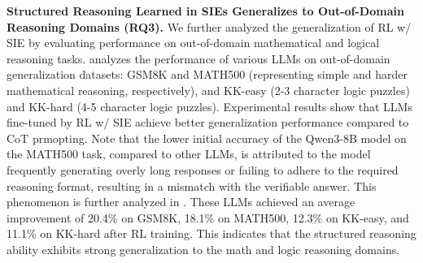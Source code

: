 \documentclass{article} %
\begin{document}
\textbf{Structured Reasoning Learned in SIEs Generalizes to Out-of-Domain Reasoning Domains (RQ3).} 
We further analyzed the generalization of RL w/ SIE by evaluating performance on out-of-domain mathematical and logical reasoning tasks. 
 analyzes the performance of various LLMs on out-of-domain generalization datasets: GSM8K and MATH500 (representing simple and harder mathematical reasoning, respectively), and KK-easy (2-3 character logic puzzles) and KK-hard (4-5 character logic puzzles). Experimental results show that LLMs fine-tuned by RL w/ SIE achieve better generalization performance compared to CoT prmopting. 
Note that the lower initial accuracy of the Qwen3-8B model on the MATH500 task, compared to other LLMs, is attributed to the model frequently generating overly long responses or failing to adhere to the required reasoning format, resulting in a mismatch with the verifiable answer. This phenomenon is further analyzed in . 
These LLMs achieved an average improvement of 20.4\% on GSM8K, 18.1\% on MATH500, 12.3\% on KK-easy, and 11.1\% on KK-hard after RL training. This indicates that the structured reasoning ability exhibits strong generalization to the math and logic reasoning domains. 
\end{document}
